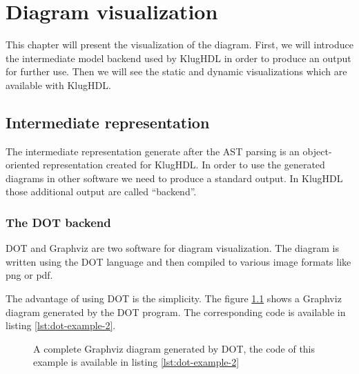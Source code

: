 \chapter{Diagram visualization}
\label{chap:diagram-visualization}

This chapter will present the visualization of the diagram. First, we will
introduce the intermediate model backend used by KlugHDL in order to produce an
output for further use. Then we will see the static and dynamic visualizations
which are available with KlugHDL.

\section{Intermediate representation}
\label{sec:intermediate-representation}

The intermediate representation generate after the AST parsing is an
object-oriented representation created for KlugHDL. In order to use the
generated diagrams in other software we need to produce a standard output. In
KlugHDL those additional output are called ``backend''.

\subsection{The DOT backend}
\label{sec:dot-backend}

DOT and Graphviz are two software for diagram visualization. The diagram is
written using the DOT language and then compiled to various image formats
like png or pdf.

The advantage of using DOT is the simplicity. The figure \ref{fig:dot-example-2}
shows a Graphviz diagram generated by the DOT program. The corresponding code is
available in listing \ref{lst:dot-example-2}.

\begin{figure}[H]
  \centering
  \caption[Example of a Graphviz diagram]{A complete Graphviz diagram generated
    by DOT, the code of this example is available in listing \ref{lst:dot-example-2}}
  \label{fig:dot-example-2}
\end{figure}


